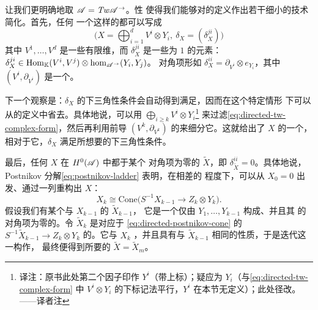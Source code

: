 \begin{remark}\label{thm:directed-complex-simplifications}
让我们更明确地取 $\mathscr{A}=\mathit{Tw}\mathscr{A}^{\rightarrow}$。\trDirected{}性
使得我们能够对\trTwistedComplex{}的定义作出若干细小的技术简化。首先，任何%
一个这样的\trComplex{}都可以写成
\begin{equation}\label{eq:directed-tw-complex-form}
\bigl(X=\bigoplus_{i=1}^{d}V^i\otimes Y_i,\ \delta_X=(\delta_X^{ji})\bigr)
\end{equation}
其中 $V^1,\ldots,V^d$ 是一些有限维\trGraded\trVectorSpace，而 $\delta_X^{ji}$
是一些\trDegree{}为 $1$ 的元素：
$\delta_X^{ji}\in\operatorname{Hom}_{\mathbb{K}}(V^i,V^j)\otimes\hom_{\mathscr{A}^{\rightarrow}}(Y_i,Y_j)$。
对角项形如 $\delta_X^{ii}=\partial_{V^i}\otimes e_{Y_i}$，其中
$(V^i,\partial_{V^i})$ 是一个\trVectorSpace\trChainComplex。

下一个观察是：$\delta_X$ 的下三角性条件会自动得到满足，因而在这个特定情形
下可以从\trTwistedComplex{}的定义中省去。具体地说，可以用
$\bigoplus_{i\ge k}V^i\otimes Y_i$\footnote{译注：原书此处第二个因子印作
$Y^i$（带上标）；疑应为 $Y_i$（与\eqref{eq:directed-tw-complex-form} 中
$V^i\otimes Y_i$ 的下标记法平行，$Y^i$ 在本节无定义）；此处径改。——译者注}
来过滤\eqref{eq:directed-tw-complex-form}，然后再利用前导\trChainComplex{}%
$(V^k,\partial_{V^k})$ 的\trDegree{}\trFiltration{}来细分它。这就给出了 $X$
的一个\trFiltration，相对于它，$\delta_X$ 满足所想要的下三角性条件。

最后，任何\trTwistedComplex{} $X$ 在 $H^0(\mathscr{A})$ 中都\trIsomorphic{}于某个
对角项为零的 $\widetilde{X}$，即 $\delta_{\widetilde{X}}^{ii}=0$。具体地说，
Postnikov 分解\eqref{eq:postnikov-ladder} 表明，在相差\trIsomorphism{}的
程度下，可以从 $X_0=0$ 出发、通过一列\trMappingCone{}重构出 $X$：
\begin{equation}\label{eq:directed-postnikov-cone}
X_k\cong\mathrm{Cone}\bigl(S^{-1}X_{k-1}\longrightarrow Z_k\otimes Y_k\bigr).
\end{equation}
假设我们有某个与 $X_{k-1}$ \trIsomorphic{}的\trObject{} $\widetilde{X}_{k-1}$，
它是一个仅由\trDirectSummand{} $Y_1,\ldots,Y_{k-1}$ 构成、并且其%
\trDifferential{}的对角项为零的\trTwistedComplex。令 $\widetilde{X}_k$ 是对应于
\eqref{eq:directed-postnikov-cone} 的\trMorphism{}%
$S^{-1}\widetilde{X}_{k-1}\to Z_k\otimes Y_k$ 的\trCone。它与 $X_k$
\trIsomorphic，并且具有与 $\widetilde{X}_{k-1}$ 相同的性质，于是迭代这一构作，
最终便得到所要的 $\widetilde{X}=\widetilde{X}_m$。
\end{remark}
